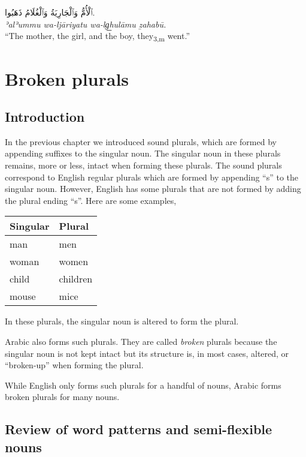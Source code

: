 \documentclass[
  10pt,
]{book}
\begin{document}
\foreignlanguage{arabic}{ٱلْأُمُّ وَٱلْجَارِيَةُ وَٱلْغُلَامُ ذَهَبُوا.}\\
\emph{ʾalʾummu wa-ljāriyatu wa-lg͟hulāmu ẕahabū.}\\
\enquote{The mother, the girl, and the boy, they\textsubscript{3,m} went.}

\chapter{Broken plurals}\label{broken-plurals}

\section{Introduction}\label{introduction-9}

In the previous chapter we introduced sound plurals, which are formed by appending suffixes to the singular noun. The singular noun in these plurals remains, more or less, intact when forming these plurals. The sound plurals correspond to English regular plurals which are formed by appending \enquote{s} to the singular noun. However, English has some plurals that are not formed by adding the plural ending \enquote{s}. Here are some examples,

\begin{longtable}[]{@{}ll@{}}
\toprule\noalign{}
Singular & Plural \\
\midrule\noalign{}
\endhead
\bottomrule\noalign{}
\endlastfoot
man & men \\
woman & women \\
child & children \\
mouse & mice \\
\end{longtable}

In these plurals, the singular noun is altered to form the plural.

Arabic also forms such plurals. They are called \emph{broken} plurals because the singular noun is not kept intact but its structure is, in most cases, altered, or \enquote{broken-up} when forming the plural.

While English only forms such plurals for a handful of nouns, Arabic forms broken plurals for many nouns.

\section{Review of word patterns and semi-flexible nouns}\label{review-of-word-patterns-and-semi-flexible-nouns}
\end{document}
